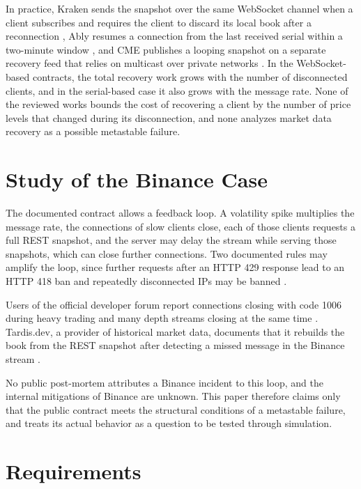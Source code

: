 \documentclass[conference]{IEEEtran}
\begin{document}
In practice, Kraken sends the snapshot over the same WebSocket channel when a client subscribes and requires the client to discard its local book after a reconnection \cite{kraken-reconnect}, Ably resumes a connection from the last received serial within a two-minute window \cite{ably-states}, and CME publishes a looping snapshot on a separate recovery feed that relies on multicast over private networks \cite{cme-recovery}. In the WebSocket-based contracts, the total recovery work grows with the number of disconnected clients, and in the serial-based case it also grows with the message rate. None of the reviewed works bounds the cost of recovering a client by the number of price levels that changed during its disconnection, and none analyzes market data recovery as a possible metastable failure.

\section{Study of the Binance Case}
\label{sec:study}

The documented contract allows a feedback loop. A volatility spike multiplies the message rate, the connections of slow clients close, each of those clients requests a full REST snapshot, and the server may delay the stream while serving those snapshots, which can close further connections. Two documented rules may amplify the loop, since further requests after an HTTP 429 response lead to an HTTP 418 ban and repeatedly disconnected IPs may be banned \cite{binance-general,binance-streams}.

Users of the official developer forum report connections closing with code 1006 during heavy trading and many depth streams closing at the same time \cite{forum-1006,forum-depth}. Tardis.dev, a provider of historical market data, documents that it rebuilds the book from the REST snapshot after detecting a missed message in the Binance stream \cite{tardis-binance}.

No public post-mortem attributes a Binance incident to this loop, and the internal mitigations of Binance are unknown. This paper therefore claims only that the public contract meets the structural conditions of a metastable failure, and treats its actual behavior as a question to be tested through simulation.

\section{Requirements}
\end{document}
